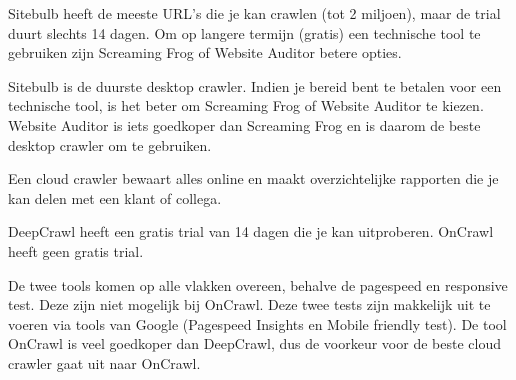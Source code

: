Sitebulb heeft de meeste URL's die je kan crawlen (tot 2 miljoen), maar de trial duurt slechts 14 dagen. Om op langere termijn (gratis) een technische tool te gebruiken zijn Screaming Frog of Website Auditor betere opties. 

Sitebulb is de duurste desktop crawler. Indien je bereid bent te betalen voor een technische tool, is het beter om Screaming Frog of Website Auditor te kiezen. Website Auditor is iets goedkoper dan Screaming Frog en is daarom de beste desktop crawler om te gebruiken.

Een cloud crawler bewaart alles online en maakt overzichtelijke rapporten die je kan delen met een klant of collega. 

DeepCrawl heeft een gratis trial van 14 dagen die je kan uitproberen. OnCrawl heeft geen gratis trial. 

De twee tools komen op alle vlakken overeen, behalve de pagespeed en responsive test. Deze zijn niet mogelijk bij OnCrawl. Deze twee tests zijn makkelijk uit te voeren via tools van Google (Pagespeed Insights en Mobile friendly test). De tool OnCrawl is veel goedkoper dan DeepCrawl, dus de voorkeur voor de beste cloud crawler gaat uit naar OnCrawl. 